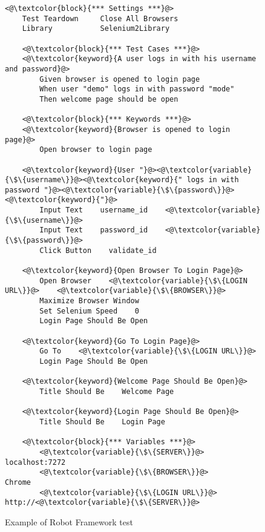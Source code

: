 \begin{figure}
\centering
\caption{Example of Robot Framework test}
\label{fig:robot-script}
\begin{minipage}{0.8\linewidth}
\begin{lstlisting}[]
    <@\textcolor{block}{*** Settings ***}@>
    Test Teardown     Close All Browsers
    Library           Selenium2Library
    
    <@\textcolor{block}{*** Test Cases ***}@>
    <@\textcolor{keyword}{A user logs in with his username and password}@>
        Given browser is opened to login page
        When user "demo" logs in with password "mode"
        Then welcome page should be open
    
    <@\textcolor{block}{*** Keywords ***}@>
    <@\textcolor{keyword}{Browser is opened to login page}@>
        Open browser to login page
    
    <@\textcolor{keyword}{User "}@><@\textcolor{variable}{\$\{username\}}@><@\textcolor{keyword}{" logs in with password "}@><@\textcolor{variable}{\$\{password\}}@><@\textcolor{keyword}{"}@>
        Input Text    username_id    <@\textcolor{variable}{\$\{username\}}@>
        Input Text    password_id    <@\textcolor{variable}{\$\{password\}}@>
        Click Button    validate_id
    
    <@\textcolor{keyword}{Open Browser To Login Page}@>
        Open Browser    <@\textcolor{variable}{\$\{LOGIN URL\}}@>    <@\textcolor{variable}{\$\{BROWSER\}}@>
        Maximize Browser Window
        Set Selenium Speed    0
        Login Page Should Be Open        
    
    <@\textcolor{keyword}{Go To Login Page}@>
        Go To    <@\textcolor{variable}{\$\{LOGIN URL\}}@>
        Login Page Should Be Open
        
    <@\textcolor{keyword}{Welcome Page Should Be Open}@>
        Title Should Be    Welcome Page
        
    <@\textcolor{keyword}{Login Page Should Be Open}@>
        Title Should Be    Login Page
    
    <@\textcolor{block}{*** Variables ***}@>
        <@\textcolor{variable}{\$\{SERVER\}}@>           localhost:7272
        <@\textcolor{variable}{\$\{BROWSER\}}@>          Chrome        
        <@\textcolor{variable}{\$\{LOGIN URL\}}@>        http://<@\textcolor{variable}{\$\{SERVER\}}@>
\end{lstlisting}
\end{minipage}
\end{figure}

